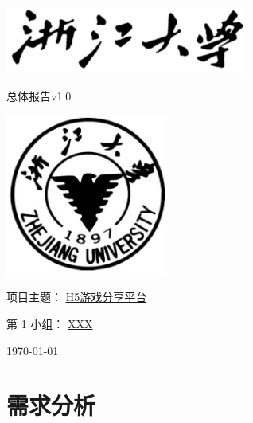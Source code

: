 \documentclass[12pt]{ctexart} %
\begin{document}
\begin{titlepage}
  \centering %
  \includegraphics[width=0.6\textwidth]{zjutitle.jpg} %
  
  \vspace{2cm} %
  
  {\fontsize{36}{48}\selectfont{} 总体报告v1.0} %
  
  \vspace{2cm} %
  
  \includegraphics[width=0.4\textwidth]{zjulogo.jpg} %
  
  \vspace{2cm}
  
  {\Huge{} 项目主题： \underline{H5游戏分享平台}} %
  
  \vspace{1cm}

  {\Large{} 第 1 小组： \underline{XXX}} %
  
  \vspace{1cm} %
  
  {\Large{} \today} %

\end{titlepage}

\newpage
\tableofcontents %
\newpage


\section{需求分析}
\end{document}
